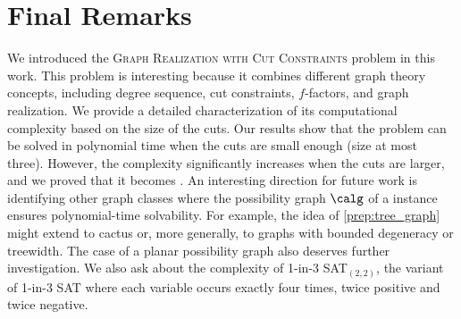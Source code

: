 \section{Final Remarks}
\label{sec:final_remarks}
We introduced the \textsc{Graph Realization with Cut Constraints} problem in this work. %
%
This problem is interesting because it combines different graph theory concepts, including degree sequence, cut constraints, $f$-factors, and graph realization.
%
We provide a detailed characterization of its computational complexity based on the size of the cuts.
%
Our results show that the problem can be solved in polynomial time when the cuts are small enough (size at most three). However, the complexity significantly increases when the cuts are larger, and we proved that it becomes \classNPH{}.
%
An interesting direction for future work is identifying other graph classes where the possibility graph $\calg$ of a \GRC{} instance ensures polynomial-time solvability. For example, the idea of \cref{prep:tree_graph} might extend to cactus or, more generally, to graphs with bounded degeneracy or treewidth. The case of a planar possibility graph also deserves further investigation. 
%
We also ask about the complexity of {1-in-3 SAT}$_{(2,2)}$, the variant of {1-in-3 SAT} where each variable occurs exactly four times, twice positive and twice negative. 
